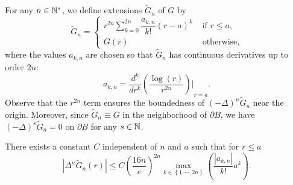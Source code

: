 \documentclass[main]{subfiles}
\begin{document}
For any $n \in \mathbb{N}^{*}$, we define extensions $\tilde{G}_n$ of $G$ by
\begin{equation}
\tilde{G}_n = \begin{cases}
r^{2n}\sum_{k=0}^{2n} \dfrac{a_{k,n}}{k!}(r-a)^k &\text{ if }r \leq a, \\
G(r) &\text{ otherwise,}
\end{cases}
\end{equation}
where the values $a_{k,n}$ are chosen so that $\tilde{G}_n$ has continuous derivatives up to order $2n$:
\[a_{k,n} = {\dfrac{d^k}{dr^k}\left(\dfrac{\log(r)}{r^{2n}}\right)\bigg|}_{r=a}.\]
Observe that the $r^{2n}$ term ensures the boundedness of $(-\Delta)^n \tilde{G}_n$ near the origin. Moreover, since $\tilde{G}_n \equiv G$ in the neighborhood of $\partial B$, we have $(-\Delta)^s \tilde{G}_n = 0$ on $\partial B$ for any $s \in \mathbb{N}$.

\begin{lemma} 
	\label{LemmeDegueu}
	There exists a constant $C$ independent of $n$ and $a$ such that for $r\leq a$
	\begin{equation}
	\left|\Delta^n \tilde{G}_n(r)\right| \leq  C \left( \frac{16n}{e}\right)^{2n}\!\!\!\!\!\max_{k\in \left\{1,\cdots,2n\right\}}\left(\dfrac{|a_{k,n}|}{k!}a^k\right).
	\label{bigBadEq1Reduced}
	\end{equation}
	\label{LemAkDeltanf}
\end{lemma}
\end{document}

